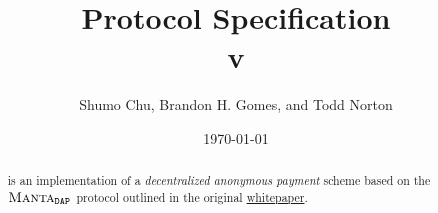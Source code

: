 \documentclass{article}
\title{\textbf{\MantaPay{} Protocol Specification}\\ v}
\author{Shumo Chu, Brandon H. Gomes, and Todd Norton}
\date{\today}
\begin{document}
    
\maketitle

\begin{abstract}
    \MantaPay{} is an implementation of a \emph{decentralized anonymous payment} scheme based on the ${{\textsc{Manta}}{}_{\texttt{DAP}}}$ protocol outlined in the original \href{https://eprint.iacr.org/2021/743.pdf}{\Manta{} whitepaper}.
\end{abstract}
    
\tableofcontents
\newpage











\end{document}
